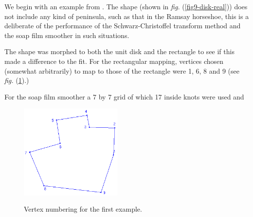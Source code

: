 \documentclass[a4paper,10pt]{amsart}
\newcommand{\sch}{Schwarz-Christoffel }
\newcommand{\fig}[1]{\emph{fig.} (\ref{#1})}
\begin{document}
We begin with an example from \cite{miller09}. The shape (shown in \fig{fig9-disk-real}) does not include any kind of peninsula, such as that in the Ramsay horseshoe, this is a deliberate of the performance of the \sch transform method and the soap film smoother in such situations. 

The shape was morphed to both the unit disk and the rectangle to see if this made a difference to the fit. For the rectangular mapping, vertices chosen (somewhat arbitrarily) to map to those of the rectangle were 1, 6, 8 and 9 (see \fig{fig9-numbered}.)

For the soap film smoother a 7 by 7 grid of which 17 inside knots were used and 

\begin{figure}[tbp]
\centering
\includegraphics[width=2in]{figs-otherdomains/fig9-numbered.png} \\
\caption{Vertex numbering for the first example.}
\label{fig9-numbered}
\end{figure}
\end{document}
